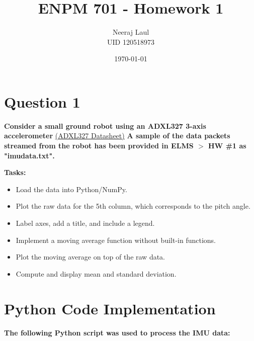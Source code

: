 \documentclass[a4paper,12pt]{article}
\title{\centering \textbf{ENPM 701 - Homework 1}}
\author{Neeraj Laul\\UID 120518973}
\date{\today}
\begin{document}
\maketitle

\section*{Question 1}
\textbf{Consider a small ground robot using an ADXL327 3-axis accelerometer}  
\href{https://www.analog.com/media/en/technical-documentation/data-sheets/adxl327.pdf}{(ADXL327 Datasheet)}  
\textbf{A sample of the data packets streamed from the robot has been provided in ELMS $>$ HW \#1 as "imudata.txt".}

\textbf{Tasks:}
\begin{itemize}
    \item Load the data into Python/NumPy.
    \item Plot the raw data for the 5th column, which corresponds to the pitch angle.
    \item Label axes, add a title, and include a legend.
    \item Implement a moving average function without built-in functions.
    \item Plot the moving average on top of the raw data.
    \item Compute and display mean and standard deviation.
\end{itemize}

\section*{Python Code Implementation}
\textbf{The following Python script was used to process the IMU data:}
\end{document}
